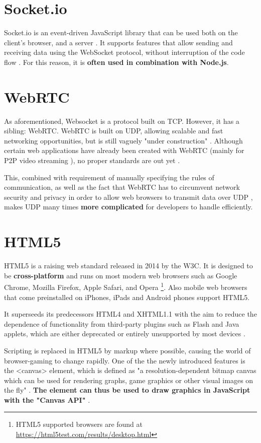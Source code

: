 \documentclass[bsc,frontabs,twoside,singlespacing,parskip,deptreport]{infthesis}     %
\begin{document}
\section{Socket.io}
Socket.io is an event-driven JavaScript library that can be used both on the client's browser, and a server \cite{Socketio}. It supports features that allow sending and receiving data using the WebSocket protocol, without interruption of the code flow \cite{Socketio_Benchmark, Socketio_TCP_Benchmark}. For this reason, it is \textbf{often used in combination with Node.js}.

\section{WebRTC}
As aforementioned, Websocket is a protocol built on TCP. However, it has a sibling: WebRTC. WebRTC is built on UDP, allowing scalable and fast networking opportunities, but is still vaguely "under construction" \cite{Browser_Networking}. Although certain web applications have already been created with WebRTC (mainly for P2P video streaming \cite{P2P_Video_Streaming_HTML5_WebRTC}), no proper standards are out yet \cite{Web_Apps_Superior}.

This, combined with requirement of manually specifying the rules of communication, as well as the fact that WebRTC has to circumvent network security and privacy in order to allow web browsers to transmit data over UDP \cite{P2P_Video_Streaming_HTML5_WebRTC}, makes UDP many times \textbf{more complicated} for developers to handle efficiently.

\section{HTML5}
HTML5 is a raising web standard released in 2014 by the W3C. It is designed to be \textbf{cross-platform} and runs on most modern web browsers such as Google Chrome, Mozilla Firefox, Apple Safari, and Opera \footnote{HTML5 supported browsers are found at \url{https://html5test.com/results/desktop.html}}. Also mobile web browsers that come preinstalled on iPhones, iPads and Android phones support HTML5.

It superseeds its predecessors HTML4 and XHTML1.1 with the aim to reduce the dependence of functionality from third-party plugins such as Flash and Java applets, which are either deprecated or entirely unsupported by most devices \cite{Death_Flash_Java}.

Scripting is replaced in HTML5 by markup where possible, causing the world of browser-gaming to change rapidly. One of the the newly introduced features is the <canvas> element, which is defined as "a resolution-dependent bitmap canvas which can be used for rendering graphs, game graphics or other visual images on the fly" \cite{HTML5_Up_and_Running}. \textbf{The element can thus be used to draw graphics in JavaScript with the "Canvas API"} \cite{Canvas_API}.
\end{document}

